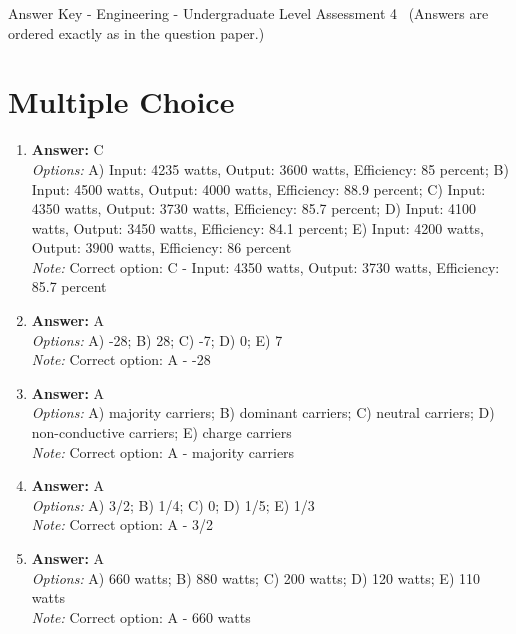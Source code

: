\documentclass[12pt]{article}
\begin{document}
\begin{center}
Answer Key - Engineering - Undergraduate Level Assessment 4 \
\small (Answers are ordered exactly as in the question paper.)
\end{center}

\section*{Multiple Choice}
\begin{enumerate}[label=\arabic*.]
\item \textbf{Answer:} C
\\ \textit{Options:} A) Input: 4235 watts, Output: 3600 watts, Efficiency: 85 percent; B) Input: 4500 watts, Output: 4000 watts, Efficiency: 88.9 percent; C) Input: 4350 watts, Output: 3730 watts, Efficiency: 85.7 percent; D) Input: 4100 watts, Output: 3450 watts, Efficiency: 84.1 percent; E) Input: 4200 watts, Output: 3900 watts, Efficiency: 86 percent
\\ \textit{Note:} Correct option: C - Input: 4350 watts, Output: 3730 watts, Efficiency: 85.7 percent
\item \textbf{Answer:} A
\\ \textit{Options:} A) -28; B) 28; C) -7; D) 0; E) 7
\\ \textit{Note:} Correct option: A - -28
\item \textbf{Answer:} A
\\ \textit{Options:} A) majority carriers; B) dominant carriers; C) neutral carriers; D) non-conductive carriers; E) charge carriers
\\ \textit{Note:} Correct option: A - majority carriers
\item \textbf{Answer:} A
\\ \textit{Options:} A) 3/2; B) 1/4; C) 0; D) 1/5; E) 1/3
\\ \textit{Note:} Correct option: A - 3/2
\item \textbf{Answer:} A
\\ \textit{Options:} A) 660 watts; B) 880 watts; C) 200 watts; D) 120 watts; E) 110 watts
\\ \textit{Note:} Correct option: A - 660 watts
\end{enumerate}
\end{document}
